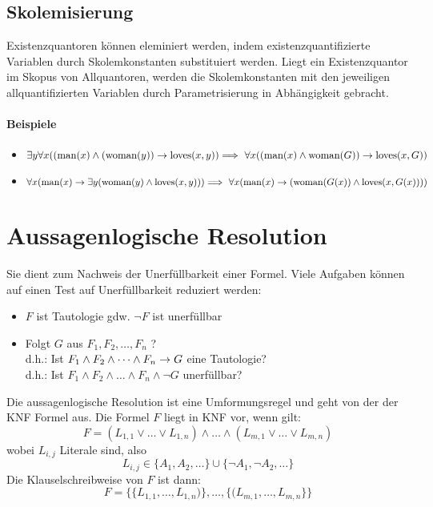 \documentclass[a4paper]{scrartcl}
\begin{document}
\subsection{Skolemisierung}
Existenzquantoren können eleminiert werden, indem existenzquantifizierte Variablen durch Skolemkonstanten substituiert werden.
Liegt ein Existenzquantor im Skopus von Allquantoren, werden die Skolemkonstanten mit den jeweiligen allquantifizierten Variablen durch Parametrisierung in Abhängigkeit gebracht.

\paragraph{Beispiele}
\begin{itemize}
\item $\exists y \forall x ((\text{man}(x) \wedge (\text{woman}(y)) \rightarrow \text{loves}(x,y))
		\\\Longrightarrow\ \forall x ((\text{man}(x) \wedge \text{woman}(G)) \rightarrow \text{loves}(x, G))$\\
\item $\forall x (\text{man}(x) \rightarrow \exists y (\text{woman}(y) \wedge \text{loves}(x,y)))\\
		\Longrightarrow\ \forall x (\text{man}(x) \rightarrow (\text{woman} (G(x)) \wedge \text{loves}(x,G(x))))$
\end{itemize}

\section{Aussagenlogische Resolution}
Sie dient zum Nachweis der Unerfüllbarkeit einer Formel. Viele Aufgaben können auf einen Test auf Unerfüllbarkeit reduziert werden:
\begin{itemize}
\item $F$ ist Tautologie gdw. $\neg F$ ist unerfüllbar
\item Folgt $G$ aus $F_1,F_2,\dots, F_n$ ? \\
      d.h.: Ist $F_1 \wedge F_2 \wedge \dots \wedge F_n \rightarrow G$ eine Tautologie? \\
      d.h.: Ist $F_1 \wedge F_2 \wedge \dots \wedge F_n \wedge \neg G$ unerfüllbar? 
\end{itemize}

Die aussagenlogische Resolution ist eine Umformungsregel und geht von der  der KNF Formel aus. 
Die Formel $F$ liegt in KNF vor, wenn gilt:
	$$F=(L_{1,1}\vee\dots\vee L_{1,n})\wedge\dots\wedge(L_{m,1} \vee\dots\vee L_{m,n})$$
wobei $L_{i,j}$ Literale sind, also 
	$$L_{i,j}\in \{A_1,A_2,\dots\}\cup\{\neg A_1,\neg A_2,\dots\}$$
Die Klauselschreibweise von $F$ ist dann: 
	$$F=\{\{L_{1,1},\dots ,L_{1,n})\},\dots,\{(L_{m,1},\dots , L_{m,n}\}\}$$
\end{document}
